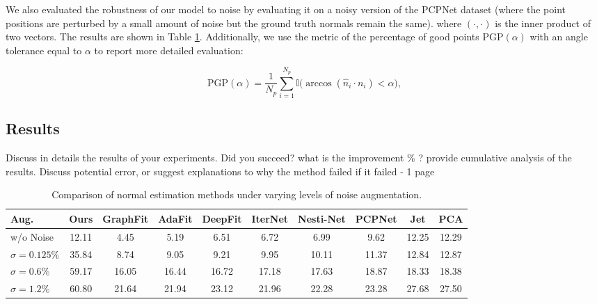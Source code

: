 \documentclass{acmart}
\begin{document}
We also evaluated the robustness of our model to noise by evaluating it on a noisy version of the PCPNet dataset (where the point positions are perturbed by a small amount of noise but the ground truth normals remain the same). where $(\cdot, \cdot)$ is the inner product of two vectors. The results are shown in Table \ref{tab:noise_comparison}. Additionally, we use the metric
of the percentage of good points $\text{PGP}(\alpha)$ with an angle tolerance equal to $\alpha$ to
report more detailed evaluation:

\begin{equation}
\text{PGP}(\alpha) = \frac{1}{N_p} \sum_{i=1}^{N_p} \mathbb{I} \big( \arccos(\hat{n}_i \cdot n_i) < \alpha \big),
\end{equation}
 \subsection{Results}
 Discuss in details the results of your experiments. Did you succeed? what is the improvement \% ? provide cumulative analysis of the results. Discuss potential error, or suggest explanations to why the method failed if it failed - 
 1 page

 \begin{table}[ht]
  \centering
  \caption{Comparison of normal estimation methods under varying levels of noise augmentation.}
  \label{tab:noise_comparison}
  \begin{tabular}{lccccccccc}
  \hline
  \textbf{Aug.} & \textbf{Ours} & \textbf{GraphFit} & \textbf{AdaFit} & \textbf{DeepFit} & \textbf{IterNet} & \textbf{Nesti-Net} & \textbf{PCPNet} & \textbf{Jet} & \textbf{PCA} \\ \hline
  w/o Noise & 12.11 & 4.45  & 5.19  & 6.51  & 6.72  & 6.99  & 9.62  & 12.25 & 12.29 \\
  $\sigma = 0.125\%$ & 35.84 & 8.74  & 9.05  & 9.21  & 9.95  & 10.11 & 11.37 & 12.84 & 12.87 \\
  $\sigma = 0.6\%$  & 59.17 & 16.05 & 16.44 & 16.72 & 17.18 & 17.63 & 18.87 & 18.33 & 18.38 \\
  $\sigma = 1.2\%$  & 60.80 & 21.64 & 21.94 & 23.12 & 21.96 & 22.28 & 23.28 & 27.68 & 27.50 \\ \hline
  \end{tabular}
  \end{table}
\end{document}
